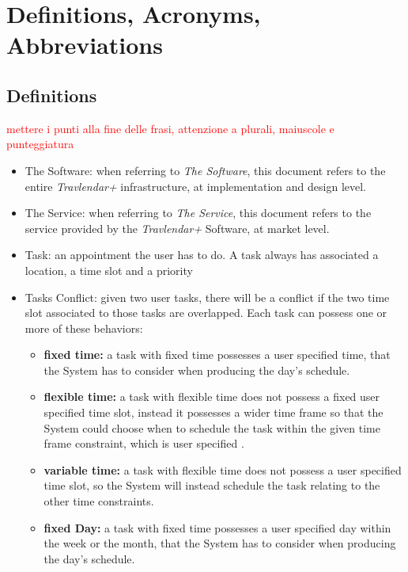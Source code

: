 \newpage
\section{Definitions, Acronyms, Abbreviations}

\subsection{Definitions}
\textcolor{red}{mettere i punti alla fine delle frasi, attenzione a plurali, maiuscole e punteggiatura }
\begin{itemize}
	\item The Software: when referring to \emph{The Software}, this document refers to the entire \emph{Travlendar+} infrastructure, at implementation and design level.
    
    \item The Service:  when referring to \emph{The Service}, this document refers to the service provided by the \emph{Travlendar+} Software, at market level.
    
	\item Task: an appointment the user has to do. A task always has associated a location, a time slot and a priority
    
	\item Tasks Conflict: given two user tasks, there will be a conflict if the two time slot associated to those tasks are overlapped. Each task can possess one or more of these behaviors:
    \begin{itemize}
        \item \textbf{fixed time:} a task with fixed time possesses a user specified time, that the System has to consider when producing the day's schedule.

	    \item \textbf{flexible time:} a task with flexible time does not possess a fixed user specified time slot, instead it possesses a wider time frame so that the System could choose when to schedule the task within the given time frame constraint, which is user specified . 
        
        \item \textbf{variable time:} a task with flexible time does not possess a user specified time slot, so the System will instead schedule the task relating to the other time constraints. 
        
       \item \textbf{fixed Day:}  a task with fixed time possesses a user specified day within the week or the month, that the System has to consider when producing the day's schedule.
       

\end{itemize}
\end{itemize}
